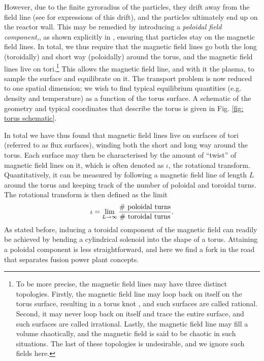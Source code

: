 However, due to the finite gyroradius of the particles, they drift away from the field line (see \citet{blank2004guiding} for expressions of this drift), and the particles ultimately end up on the reactor wall. This may be remedied by introducing a {\it poloidal field component,}, as shown explicitly in \citet{helander2014theory}, ensuring that particles stay on the magnetic field lines. In total, we thus require that the magnetic field lines go both the long (toroidally) and short way (poloidally) around the torus, and the magnetic field lines live on tori.\footnote{To be more precise, the magnetic field lines may have three distinct topologies. Firstly, the magnetic field line may loop back on itself on the torus surface, resulting in a torus knot \cite{livingston1993knot,smiet2017knots}, and such surfaces are called rational. Second, it may never loop back on itself and trace the entire surface, and such surfaces are called irrational. Lastly, the magnetic field line may fill a volume chaotically, and the magnetic field is said to be chaotic in such situations. The last of these topologies is undesirable, and we ignore such fields here.} This allows the magnetic field line, and with it the plasma, to sample the surface and equilibrate on it. The transport problem is now reduced to one spatial dimension; we wish to find typical equilibrium quantities (e.g. density and temperature) as a function of the torus surface. A schematic of the geometry and typical coordinates that describe the torus is given in Fig. \ref{fig: torus schematic}.
\par 
In total we have thus found that magnetic field lines live on surfaces of tori (referred to as flux surfaces), winding both the short and long way around the torus. Each surface may then be characterised by the amount of ``twist'' of magnetic field lines on it, which is often denoted as $\iota$, the rotational transform. Quantitatively, it can be measured by following a magnetic field line of length $L$ around the torus and keeping track of the number of poloidal and toroidal turns. The rotational transform is then defined as the limit
\begin{equation}
    \iota = \lim_{L \rightarrow \infty} \frac{\textnormal{\# poloidal turns}}{\textnormal{\# toroidal turns}}.
    \label{eq: rotational transform integer definition}
\end{equation}
As stated before, inducing a toroidal component of the magnetic field can readily be achieved by bending a cylindrical solenoid into the shape of a torus. Attaining a poloidal component is less straightforward, and here we find a fork in the road that separates fusion power plant concepts.

